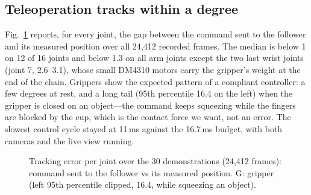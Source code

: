\documentclass[10pt,twocolumn,letterpaper]{article}
\begin{document}
\subsection{Teleoperation tracks within a degree}
Fig.~\ref{fig:tracking} reports, for every joint, the gap between the command sent to the follower and its measured
position over all 24{,}412 recorded frames. The median is below 1\textdegree{} on 12 of 16 joints and below
1.3\textdegree{} on all arm joints except the two last wrist joints (joint 7, 2.6--3.1\textdegree), whose small DM4310
motors carry the gripper's weight at the end of the chain. Grippers show the expected pattern of a compliant
controller: a few degrees at rest, and a long tail (95th percentile 16.4\textdegree{} on the left) when the gripper is
closed on an object---the command keeps squeezing while the fingers are blocked by the cup, which is the contact force
we want, not an error. The slowest control cycle stayed at 11\,ms against the 16.7\,ms budget, with both cameras and the
live view running.

\begin{figure}[t]
\centering
{}
\caption{Tracking error per joint over the 30 demonstrations (24{,}412 frames): command sent to the follower vs its
measured position. G: gripper (left 95th percentile clipped, 16.4\textdegree, while squeezing an object).}
\label{fig:tracking}
\end{figure}
\end{document}
